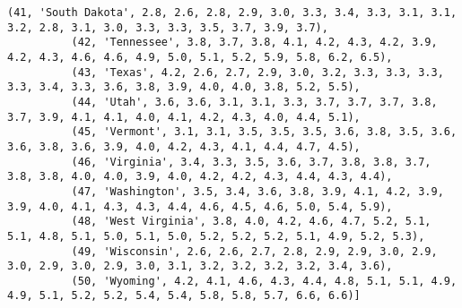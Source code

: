 \documentclass[11pt]{article}
\begin{document}
\begin{Verbatim}[commandchars=\\\{\}]
          (41, 'South Dakota', 2.8, 2.6, 2.8, 2.9, 3.0, 3.3, 3.4, 3.3, 3.1, 3.1, 3.2, 2.8, 3.1, 3.0, 3.3, 3.3, 3.5, 3.7, 3.9, 3.7),
          (42, 'Tennessee', 3.8, 3.7, 3.8, 4.1, 4.2, 4.3, 4.2, 3.9, 4.2, 4.3, 4.6, 4.6, 4.9, 5.0, 5.1, 5.2, 5.9, 5.8, 6.2, 6.5),
          (43, 'Texas', 4.2, 2.6, 2.7, 2.9, 3.0, 3.2, 3.3, 3.3, 3.3, 3.3, 3.4, 3.3, 3.6, 3.8, 3.9, 4.0, 4.0, 3.8, 5.2, 5.5),
          (44, 'Utah', 3.6, 3.6, 3.1, 3.1, 3.3, 3.7, 3.7, 3.7, 3.8, 3.7, 3.9, 4.1, 4.1, 4.0, 4.1, 4.2, 4.3, 4.0, 4.4, 5.1),
          (45, 'Vermont', 3.1, 3.1, 3.5, 3.5, 3.5, 3.6, 3.8, 3.5, 3.6, 3.6, 3.8, 3.6, 3.9, 4.0, 4.2, 4.3, 4.1, 4.4, 4.7, 4.5),
          (46, 'Virginia', 3.4, 3.3, 3.5, 3.6, 3.7, 3.8, 3.8, 3.7, 3.8, 3.8, 4.0, 4.0, 3.9, 4.0, 4.2, 4.2, 4.3, 4.4, 4.3, 4.4),
          (47, 'Washington', 3.5, 3.4, 3.6, 3.8, 3.9, 4.1, 4.2, 3.9, 3.9, 4.0, 4.1, 4.3, 4.3, 4.4, 4.6, 4.5, 4.6, 5.0, 5.4, 5.9),
          (48, 'West Virginia', 3.8, 4.0, 4.2, 4.6, 4.7, 5.2, 5.1, 5.1, 4.8, 5.1, 5.0, 5.1, 5.0, 5.2, 5.2, 5.2, 5.1, 4.9, 5.2, 5.3),
          (49, 'Wisconsin', 2.6, 2.6, 2.7, 2.8, 2.9, 2.9, 3.0, 2.9, 3.0, 2.9, 3.0, 2.9, 3.0, 3.1, 3.2, 3.2, 3.2, 3.2, 3.4, 3.6),
          (50, 'Wyoming', 4.2, 4.1, 4.6, 4.3, 4.4, 4.8, 5.1, 5.1, 4.9, 4.9, 5.1, 5.2, 5.2, 5.4, 5.4, 5.8, 5.8, 5.7, 6.6, 6.6)]
\end{Verbatim}
            
\end{document}
